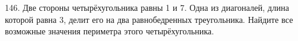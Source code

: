 146. Две стороны четырёхугольника равны 1 и 7. Одна из диагоналей, длина которой равна 3, делит его на два равнобедренных треугольника. Найдите все возможные значения периметра этого четырёхугольника.\\
